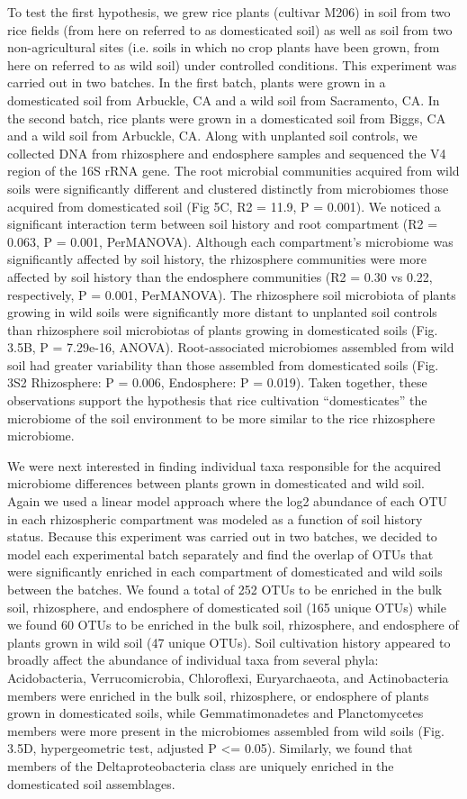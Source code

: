 To test the first hypothesis, we grew rice plants (cultivar M206) in soil from two rice fields (from here on referred to as domesticated soil) as well as soil from two non-agricultural sites (i.e. soils in which no crop plants have been grown, from here on referred to as wild soil) under controlled conditions. This experiment was carried out in two batches. In the first batch, plants were grown in a domesticated soil from Arbuckle, CA and a wild soil from Sacramento, CA. In the second batch, rice plants were grown in a domesticated soil from Biggs, CA and a wild soil from Arbuckle, CA. Along with unplanted soil controls, we collected DNA from rhizosphere and endosphere samples and sequenced the V4 region of the 16S rRNA gene. The root microbial communities acquired from wild soils were significantly different and clustered distinctly from microbiomes those acquired from domesticated soil (Fig 5C, R2 = 11.9, P = 0.001). We noticed a significant interaction term between soil history and root compartment (R2 = 0.063, P = 0.001, PerMANOVA). Although each compartment's microbiome was significantly affected by soil history, the rhizosphere communities were more affected by soil history than the endosphere communities (R2 = 0.30 vs 0.22, respectively, P = 0.001, PerMANOVA). The rhizosphere soil microbiota of plants growing in wild soils were significantly more distant to unplanted soil controls than rhizosphere soil microbiotas of plants growing in domesticated soils (Fig. 3.5B, P = 7.29e-16, ANOVA). Root-associated microbiomes assembled from wild soil had greater variability than those assembled from domesticated soils (Fig. 3S2 Rhizosphere: P = 0.006, Endosphere: P = 0.019). Taken together, these observations support the hypothesis that rice cultivation “domesticates” the microbiome of the soil environment to be more similar to the rice rhizosphere microbiome.

We were next interested in finding individual taxa responsible for the acquired microbiome differences between plants grown in domesticated and wild soil. Again we used a linear model approach where the log2 abundance of each OTU in each rhizospheric compartment was modeled as a function of soil history status. Because this experiment was carried out in two batches, we decided to model each experimental batch separately and find the overlap of OTUs that were significantly enriched in each compartment of domesticated and wild soils between the batches. We found a total of 252 OTUs to be enriched in the bulk soil, rhizosphere, and endosphere of domesticated soil (165 unique OTUs) while we found 60 OTUs to be enriched in the bulk soil, rhizosphere, and endosphere of plants grown in wild soil (47 unique OTUs). Soil cultivation history appeared to broadly affect the abundance of individual taxa from several phyla: Acidobacteria, Verrucomicrobia, Chloroflexi, Euryarchaeota, and Actinobacteria members were enriched in the bulk soil, rhizosphere, or endosphere of plants grown in domesticated soils, while Gemmatimonadetes and Planctomycetes members were more present in the microbiomes assembled from wild soils (Fig. 3.5D, hypergeometric test, adjusted P <= 0.05). Similarly, we found that members of the Deltaproteobacteria class are uniquely enriched in the domesticated soil assemblages. 

